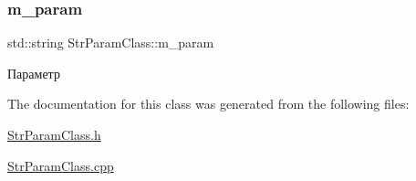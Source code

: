 \subsubsection{\texorpdfstring{m\+\_\+param}{m\_param}}
{\footnotesize\ttfamily std\+::string Str\+Param\+Class\+::m\+\_\+param\hspace{0.3cm}{\ttfamily [private]}}



Параметр 



The documentation for this class was generated from the following files\+:\begin{DoxyCompactItemize}
\item 
\hyperlink{_str_param_class_8h}{Str\+Param\+Class.\+h}\item 
\hyperlink{_str_param_class_8cpp}{Str\+Param\+Class.\+cpp}\end{DoxyCompactItemize}
